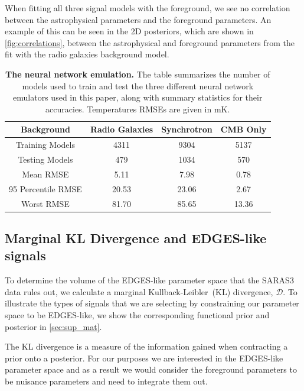 When fitting all three signal models with the foreground, we see no correlation between the astrophysical parameters and the foreground parameters. An example of this can be seen in the 2D posteriors, which are shown in \cref{fig:correlations}, between the astrophysical and foreground parameters from the fit with the radio galaxies background model.

\bgroup
\def\arraystretch{1.5}
\begin{table}[ht!]
    \centering
    \begin{tabular}{|c|c|c|c|}
    \hline
         Background & Radio Galaxies & Synchrotron & CMB Only \\
         \hline
         \hline
         Training Models & 4311 & 9304 & 5137 \\
         \hline
         Testing Models & 479 & 1034 & 570 \\
         \hline
         \hline
         Mean RMSE & 5.11 & 7.98 & 0.78 \\
         \hline
         95 Percentile RMSE & 20.53 & 23.06 & 2.67 \\
         \hline
         Worst RMSE & 81.70 & 85.65 & 13.36\\
         \hline
    \end{tabular}
    \caption{\textbf{The neural network emulation.} The table summarizes the number of models used to train and test the three different neural network emulators used in this paper, along with summary statistics for their accuracies. Temperatures RMSEs are given in mK.}
    \label{tab:networks}
\end{table}
\egroup

\subsection{Marginal KL Divergence and EDGES-like signals}

To determine the volume of the EDGES-like parameter space that the SARAS3 data rules out, we calculate a marginal Kullback-Leibler~(KL) divergence, $\mathcal{D}$. To illustrate the types of signals that we are selecting by constraining our parameter space to be EDGES-like, we show the corresponding functional prior and posterior in \cref{sec:sup_mat}.

The KL divergence is a measure of the information gained when contracting a prior onto a posterior. For our purposes we are interested in the EDGES-like parameter space and as a result we would consider the foreground parameters to be nuisance parameters and need to integrate them out.

